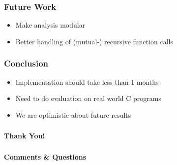 \documentclass[xcolor=dvipsnames]{beamer}
\begin{document}
\begin{frame}
  \frametitle{Future Work} {
   \Large
	\begin{itemize}
	\item Make analysis modular
	\vspace{0.5cm}	
	\item Better handling of (mutual-) recursive function calls
	\end{itemize}   
	}
\end{frame}

\begin{frame}
  \frametitle{Conclusion} {
   \Large
	\begin{itemize}
	\item Implementation should take less than 1 months
	\vspace{0.5cm}
	\item Need to do evaluation on real world C programs
	\vspace{0.5cm}	
	\item We are optimistic about future results
	\end{itemize}   
	}
\end{frame}

\begin{frame}
  \frametitle{} {\LARGE
\begin{center}
\textbf{Thank You!}
\end{center}
}
\end{frame}

\begin{frame}
  \frametitle{} {\LARGE
\begin{center}
\textbf{Comments \& Questions}
\end{center}
}
\end{frame}
\end{document}
